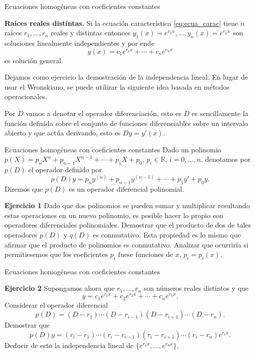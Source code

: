 \documentclass[hyperref={colorlinks=true}]{beamer}
\newcommand{\rr}{\mathbb{R}}
\renewcommand{\emph}[1]{\textcolor[rgb]{1,0,0}{#1}}
\begin{document}
\begin{frame}{Ecuaciones homogéneas con coeficientes constantes}\label{pag:oper1}

\textbf{Raices reales distintas.}
Si la ecuación característica \eqref{eq:ecua_carac} tiene $n$ raíces $r_1,\ldots,r_n$ reales y distintas entonces 
$y_1(x)=e^{r_1x},\ldots,y_n(x)=e^{r_nx}$ son soluciones linealmente independientes y por ende
\[\boxed{y(x)=c_1e^{r_1x}+\cdots+c_ne^{r_nx}}\]
es solución general. 

Dejamos como ejercicio la demostración de la independencia lineal. En lugar de usar el Wronskiano, se puede utilizar  la siguiente idea basada en métodos operacionales. 

Por $D$ vamos a denotar el operador diferenciación, esto es $D$ es sencillamente la función  definida sobre el conjunto de funciones diferenciables sobre un intervalo abierto y que actúa derivando, esto es $Dy=y'(x)$. 





\end{frame}





\begin{frame}{Ecuaciones homogéneas con coeficientes constantes}\label{pag:oper2}
Dado un polinomio $p(X)=p_nX^n+p_{n-1}X^{n-1}+\cdots+p_1X+p_0$, $p_i\in\rr$, $i=0,\ldots,n$, denotamos por  $p(D)$ el operador definido por
\[p(D)y=p_ny^{(n)}+p_{n-1}y^{(n-1)}+\cdots+p_1y'+p_0y.\]
Diremos que $p(D)$ es un \emph{operador diferencial polinomial}. 

\textbf{Ejercicio 1} Dado que dos polinomios se pueden sumar y multiplicar resultando estas operaciones en un nuevo polinomio, es posible hacer lo propio con operadores diferenciales polinomiales. Demostrar que el producto de dos de tales operadores  $p(D)$ y $q(D)$ es conmutativo. Esta propiedad es lo mismo que afirmar que el producto de polinomios es conmutativo. Analizar que ocurriría si permitiesemos que los coeficientes $p_i$ fuese funciones de $x$, $p_i=p_i(x)$.
 
\end{frame}

\begin{frame}{Ecuaciones homogéneas con coeficientes constantes}\label{pag:oper3}

\textbf{Ejercicio 2} Supongamos ahora que $r_1,\ldots,r_n$ son números reales distintos y que 
\[y=c_1e^{r_1x}+c_2e^{r_2x}+\cdots+c_ne^{r_nx}.\]
Considerar el operador diferencial
\[p(D)=(D-r_1)\cdots(D-r_{i-1})(D-r_{i+1})\cdots(D-r_n).\]
Demostrar que
\[p(D)y=(r_i-r_1)\cdots(r_i-r_{i-1})(r_i-r_{i+1})\cdots(r_i-r_n)e^{r_ix}.\]
Deducir de esto la independencia lineal de $\{e^{r_1x},\ldots,e^{r_nx}\}$.
\end{frame}
\end{document}

